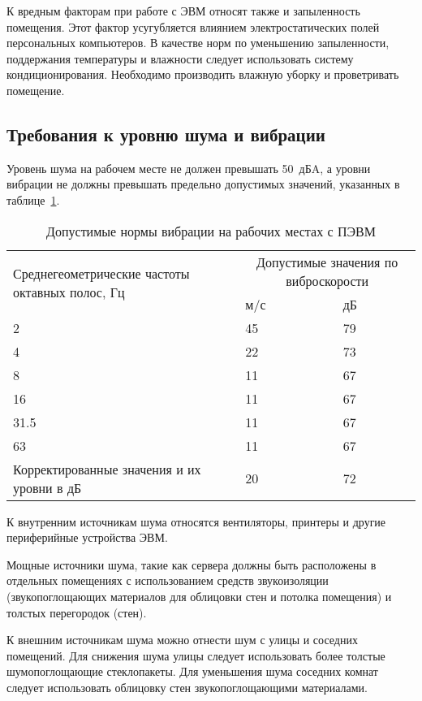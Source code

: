 К вредным факторам при работе с ЭВМ относят также и запыленность помещения.
Этот фактор усугубляется влиянием электростатических полей персональных
компьютеров. В качестве норм по уменьшению запыленности, поддержания
температуры и влажности следует использовать систему кондиционирования.
Необходимо производить влажную уборку и проветривать помещение.

\subsection{Требования к уровню шума и вибрации}
Уровень шума на рабочем месте не должен превышать 50~дБA, а уровни вибрации не
должны превышать предельно допустимых значений, указанных в
таблице~\ref{tab:vibration}.

\begin{table}[h]
  \centering
  \caption{Допустимые нормы вибрации на рабочих местах с ПЭВМ}
  \label{tab:vibration}
  \begin{tabular}{|p{}|p{}|p{}|}
    \hline
    \multirow{2}{\hsize}{Среднегеометрические частоты октавных полос, Гц} &
    \multicolumn{2}{|c|}{Допустимые значения по виброскорости} \\
    \cline{2-3}
    & м/с & дБ \\
    \hline
    2 & 45 & 79 \\
    \hline
    4 & 22 & 73 \\
    \hline
    8 & 11 & 67\\
    \hline
    16 & 11 & 67 \\
    \hline
    31.5 & 11 & 67 \\
    \hline
    63 & 11 & 67 \\
    \hline
    Корректированные значения и их уровни в дБ & 20 & 72 \\
    \hline
  \end{tabular}
\end{table}

К внутренним источникам шума относятся вентиляторы, принтеры и другие
периферийные устройства ЭВМ.

Мощные источники шума, такие как сервера должны быть расположены в отдельных
помещениях с использованием средств звукоизоляции (звукопоглощающих материалов
для облицовки стен и потолка помещения) и толстых перегородок (стен).

К внешним источникам шума можно отнести шум с улицы и соседних помещений. Для
снижения шума улицы следует использовать более толстые шумопоглощающие
стеклопакеты. Для уменьшения шума соседних комнат следует использовать облицовку
стен звукопоглощающими материалами.

